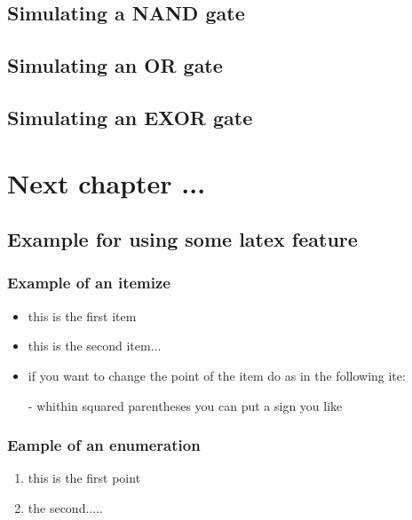 \section{Simulating a NAND gate}

\section{Simulating an OR gate}


\section{Simulating an EXOR gate}



\chapter{Next chapter ...}



\section{Example for using some latex feature}

\subsection{Example of an itemize}

\begin{itemize}
\item this is the first item
\item this is the second item...
\item if you want to change the point of the item do as in the following ite:
\item[-] whithin squared parentheses you can put a sign you like
\end{itemize} 


\subsection{Eample of an enumeration}

\begin{enumerate}
\item this is the first point
\item the second.....
\end{enumerate}




